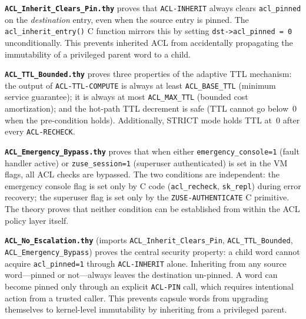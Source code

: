 \textbf{\texttt{ACL\_Inherit\_Clears\_Pin.thy}} proves that
\texttt{ACL-INHERIT} always clears \texttt{acl\_pinned} on the
\emph{destination} entry, even when the source entry is pinned. The
\texttt{acl\_inherit\_entry()} C function mirrors this by setting
\texttt{dst->acl\_pinned = 0} unconditionally. This prevents inherited ACL
from accidentally propagating the immutability of a privileged parent word to
a child.

\textbf{\texttt{ACL\_TTL\_Bounded.thy}} proves three properties of the
adaptive TTL mechanism: the output of \texttt{ACL-TTL-COMPUTE} is always at
least \texttt{ACL\_BASE\_TTL} (minimum service guarantee); it is always at
most \texttt{ACL\_MAX\_TTL} (bounded cost amortization); and the hot-path TTL
decrement is safe (TTL cannot go below~0 when the pre-condition holds).
Additionally, STRICT mode holds TTL at~0 after every \texttt{ACL-RECHECK}.

\textbf{\texttt{ACL\_Emergency\_Bypass.thy}} proves that when either
\texttt{emergency\_console=1} (fault handler active) or
\texttt{zuse\_session=1} (superuser authenticated) is set in the VM flags, all
ACL checks are bypassed. The two conditions are independent: the emergency
console flag is set only by C code (\texttt{acl\_recheck}, \texttt{sk\_repl})
during error recovery; the superuser flag is set only by the
\texttt{ZUSE-AUTHENTICATE} C primitive. The theory proves that neither
condition can be established from within the ACL policy layer itself.

\textbf{\texttt{ACL\_No\_Escalation.thy}} (imports
\texttt{ACL\_Inherit\_Clears\_Pin}, \texttt{ACL\_TTL\_Bounded},
\texttt{ACL\_Emergency\_Bypass}) proves the central security property: a child
word cannot acquire \texttt{acl\_pinned=1} through \texttt{ACL-INHERIT} alone.
Inheriting from any source word---pinned or not---always leaves the destination
un-pinned. A word can become pinned only through an explicit \texttt{ACL-PIN}
call, which requires intentional action from a trusted caller. This prevents
capsule words from upgrading themselves to kernel-level immutability by
inheriting from a privileged parent.
